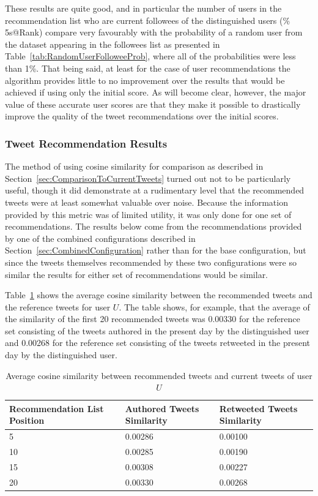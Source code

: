 These results are quite good, and in particular the number of users in the recommendation list who are current followees of the distinguished users (\% 5s@Rank) compare very favourably with the probability of a random user from the dataset appearing in the followees list as presented in Table~\ref{tab:RandomUserFolloweeProb}, where all of the probabilities were less than 1\%. That being said, at least for the case of user recommendations the algorithm provides little to no improvement over the results that would be achieved if using only the initial score. As will become clear, however, the major value of these accurate user scores are that they make it possible to drastically improve the quality of the tweet recommendations over the initial scores.



\subsubsection{Tweet Recommendation Results}

The method of using cosine similarity for comparison as described in Section~\ref{sec:ComparisonToCurrentTweets} turned out not to be particularly useful, though it did demonstrate at a rudimentary level that the recommended tweets were at least somewhat valuable over noise. Because the information provided by this metric was of limited utility, it was only done for one set of recommendations. The results below come from the recommendations provided by one of the combined configurations described in Section~\ref{sec:CombinedConfiguration} rather than for the base configuration, but since the tweets themselves recommended by these two configurations were so similar the results for either set of recommendations would be similar.

Table~\ref{tab:RecommendedTweetSimilarity} shows the average cosine similarity between the recommended tweets and the reference tweets for user $U$. The table shows, for example, that the average of the similarity of the first 20 recommended tweets was 0.00330 for the reference set consisting of the tweets authored in the present day by the distinguished user and 0.00268 for the reference set consisting of the tweets retweeted in the present day by the distinguished user.


\begin{table}
\centering
\begin{tabular}{p{3.5cm}|p{4cm}|p{4cm}}
{\bf Recommendation List Position} & {\bf Authored Tweets Similarity} & {\bf Retweeted Tweets Similarity} \\ \hline
 5 & 0.00286 & 0.00100 \\ \hline
10 & 0.00285 & 0.00190 \\ \hline
15 & 0.00308 & 0.00227 \\ \hline
20 & 0.00330 & 0.00268 \\
\end{tabular}
\caption{Average cosine similarity between recommended tweets and current tweets of user $U$}
\label{tab:RecommendedTweetSimilarity}
\end{table}

